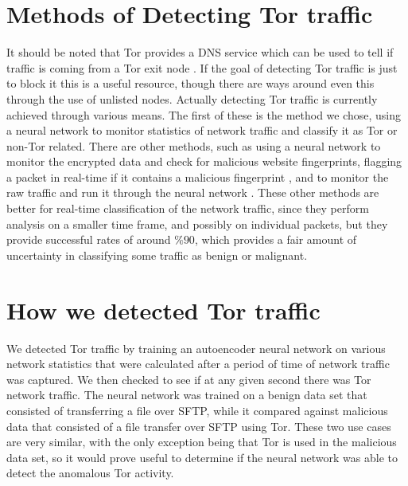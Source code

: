 \documentclass[conference,12pt]{IEEEtran}
\begin{document}
\section{Methods of Detecting Tor traffic}

It should be noted that Tor provides a DNS service which can be used to tell if traffic is coming from a Tor exit node \parencite{cite:Tor-Site}.  If the goal of detecting Tor traffic is just to block it this is a useful resource, though there are ways around even this through the use of unlisted nodes. Actually detecting Tor traffic is currently achieved through various means. The first of these is the method we chose, using a neural network to monitor statistics of network traffic and classify it as Tor or non-Tor related. There are other methods, such as using a neural network to monitor the encrypted data and check for malicious website fingerprints, flagging a packet in real-time if it contains a malicious fingerprint \parencite{cite:Adaptive-Onsite-Website-Fingerprinting}, and to monitor the raw traffic and run it through the neural network \parencite{cite:Machine-Learning-Tor-Detection}. These other methods are better for real-time classification of the network traffic, since they perform analysis on a smaller time frame, and possibly on individual packets, but they provide successful rates of around $\%90$, which provides a fair amount of uncertainty in classifying some traffic as benign or malignant.

\section{How we detected Tor traffic}
We detected Tor traffic by training an autoencoder neural network on various network statistics that were calculated after a period of time of network traffic was captured. We then checked to see if at any given second there was Tor network traffic. The neural network was trained on a benign data set that consisted of transferring a file over SFTP, while it compared against malicious data that consisted of a file transfer over SFTP using Tor. These two use cases are very similar, with the only exception being that Tor is used in the malicious data set, so it would prove useful to determine if the neural network was able to detect the anomalous Tor activity.
\end{document}
